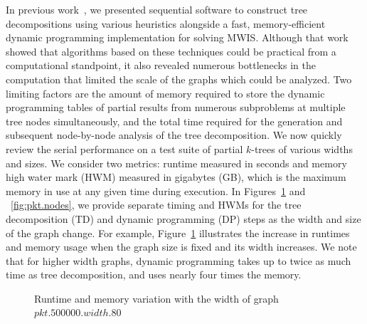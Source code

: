 \documentclass[conference]{IEEEtran}
\begin{document}
In previous work~\cite{serialTM}, we presented sequential software to
construct tree decompositions using various heuristics alongside a fast,
memory-efficient dynamic programming implementation for solving MWIS.
Although that work showed that algorithms based on these techniques could be practical from a computational standpoint,
it also revealed numerous bottlenecks in the computation that limited the scale of the graphs which could be analyzed.
Two limiting factors are the amount of memory required to store the dynamic programming tables of partial results from
numerous subproblems at multiple tree nodes simultaneously, and the total time required for the generation and subsequent node-by-node analysis of
the tree decomposition. We now quickly review the serial performance on
a test suite of partial $k$-trees of various widths and
sizes. We consider two metrics: runtime measured in seconds
and memory high water mark (HWM) measured in gigabytes (GB), which is the
maximum memory in use at any given time during execution. In Figures~\ref{fig:pkt.width} and
~\ref{fig:pkt.nodes}, we provide separate timing and HWMs for the tree decomposition (TD)
and dynamic programming (DP) steps as the width and size of the graph change. For example,
Figure~\ref{fig:pkt.width} illustrates the increase in runtimes and memory usage when the
graph size is fixed and its width increases.
We note that for higher width graphs, dynamic programming takes up to twice as much time
as tree decomposition, and uses nearly four times the memory.

\begin{figure}[!ht]
\caption{Runtime and memory variation with the width of graph
  $pkt.500000.width.80$}
\label{fig:pkt.width}
\end{figure}
\end{document}

